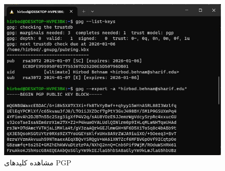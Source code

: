 \documentclass[]{article}
\begin{document}
\begin{figure}[H]
    \centering
    \includegraphics[scale=0.5]{pics/gpg-view.jpg}
    \caption{مشاهده کلید‌های PGP}
    \label{fig:gpg:view}
\end{figure}
\end{document}
